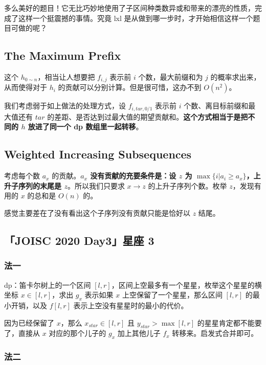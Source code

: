 \documentclass[12pt, a4paper, oneside]{ctexart}
\begin{document}
多么美好的题目！它无比巧妙地使用了子区间种类数异或和带来的漂亮的性质，完成了这样一个挺震撼的事情。究竟 lxl 是从做到哪一步时，才开始相信这样一个题目可做的呢？

\subsection{The Maximum Prefix}

这个 $h_{0\sim n}$，相当让人想要把 $f_{i,j}$ 表示前 $i$ 个数，最大前缀和为 $j$ 的概率求出来，从而使得对于 $h_i$ 的贡献可以分别计算。但是很可惜，这办不到 $O(n^2)$。

我们考虑弱于如上做法的处理方式，设 $f_{i,tar,0/1}$ 表示前 $i$ 个数、离目标前缀和最大值还有 $tar$ 的差距、是否达到过最大值的期望贡献和。\textbf{这个方式相当于是把不同的 $h$ 放进了同一个 dp 数组里一起转移}。

\subsection{Weighted Increasing Subsequences}

考虑每个数 $a_x$ 的贡献。\textbf{$a_x$ 没有贡献的充要条件是：设 $z$ 为 $\max\{i|a_i\ge a_x\}$，上升子序列的末尾是 $z$}。所以我们只要求 $x\rightarrow z$ 的上升子序列个数。枚举 $z$，发现有用的 $x$ 的总和是 $O(n)$ 的。

感觉主要差在了没有看出这个子序列没有贡献只能是恰好以 $z$ 结尾。

\subsection{「JOISC 2020 Day3」星座 3}

\subsubsection{法一}

dp：笛卡尔树上的一个区间 $[l,r]$，区间上空最多有一个星星，枚举这个星星的横坐标 $x\in[l,r]$，求出 $g_x$ 表示如果 $x$ 上空保留了一个星星，那么区间 $[l,r]$ 的最小开销，以及 $f[l,r]$ 表示上空没有星星时的最小的代价。

因为已经保留了 $x$，那么 $x_{star} \in [l,r]$ 且 $y_{star} > \max[l, r]$ 的星星肯定都不能要了，直接从 $x$ 对应的那个儿子的 $g_x$ 加上其他儿子 $f_x$ 转移来。启发式合并即可。

\subsubsection{法二}
\end{document}
